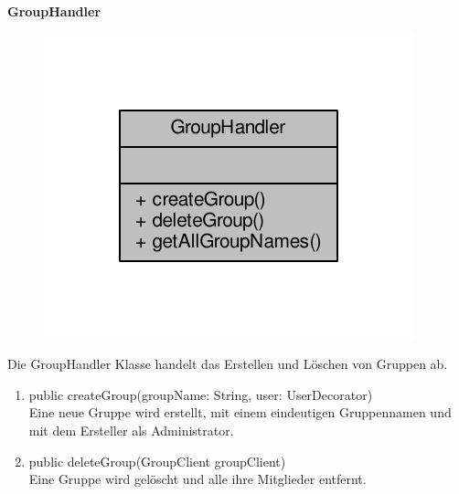 \textbf{GroupHandler}
\begin{figure}[H]
	\includegraphics[scale = 1]{res/umlClasses/group_handler__coll__graph.pdf}
	\centering
\end{figure}
Die GroupHandler Klasse handelt das Erstellen und Löschen von Gruppen ab.
\begin{enumerate}
	\item public createGroup(groupName: String, user: UserDecorator)\\
		Eine neue Gruppe wird erstellt, mit einem eindeutigen Gruppennamen und mit dem Ersteller als Administrator.
	\item public deleteGroup(GroupClient groupClient)\\
		Eine Gruppe wird gelöscht und alle ihre Mitglieder entfernt.
\end{enumerate}

